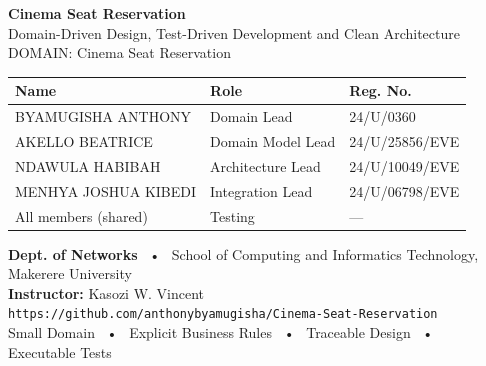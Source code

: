\documentclass[aspectratio=169,11pt]{beamer}
\newcommand{\code}[1]{\texttt{#1}}
\begin{document}
\begin{frame}[plain]
  \centering
  \vspace{0.35cm}
  {\Huge\color{primary}\textbf{Cinema Seat Reservation}}\\[0.3cm]
  {\large\color{accent} Domain-Driven Design, Test-Driven Development
  and Clean Architecture}\\[0.4cm]
  {\small DOMAIN: Cinema Seat Reservation}\\[1.1cm]

  \begin{center}
  \begin{tabularx}{0.82\textwidth}{@{}l X l@{}}
    \toprule
    \textbf{Name} & \textbf{Role} & \textbf{Reg. No.} \\
    \midrule
    BYAMUGISHA ANTHONY & Domain Lead & 24/U/0360 \\
    AKELLO BEATRICE & Domain Model Lead & 24/U/25856/EVE \\
    NDAWULA HABIBAH & Architecture Lead & 24/U/10049/EVE \\
    MENHYA JOSHUA KIBEDI & Integration Lead & 24/U/06798/EVE \\
    All members (shared) & Testing & --- \\
    \bottomrule
  \end{tabularx}
  \end{center}

  \vspace{0.7cm}
  {\small \textbf{Dept. of Networks} ~•~ School of Computing and
  Informatics Technology, Makerere University}\\
  {\small \textbf{Instructor:} Kasozi W. Vincent}\\[0.35cm]
  {\footnotesize \code{https://github.com/anthonybyamugisha/Cinema-Seat-Reservation}}\\[0.25cm]
  {\footnotesize Small Domain ~•~ Explicit Business Rules ~•~ Traceable Design ~•~ Executable Tests}
\end{frame}
\end{document}
